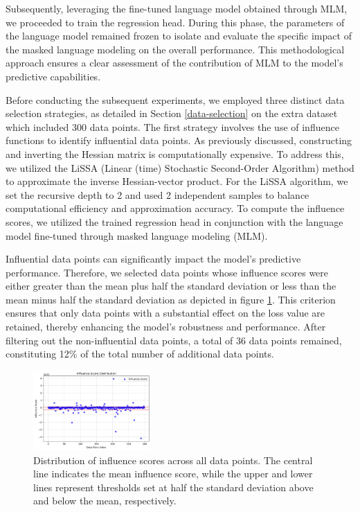 \documentclass[11pt]{article}
\begin{document}
Subsequently, leveraging the fine-tuned language model obtained through MLM, we proceeded to train the regression head. During this phase, the parameters of the language model remained frozen to isolate and evaluate the specific impact of the masked language modeling on the overall performance. This methodological approach ensures a clear assessment of the contribution of MLM to the model's predictive capabilities.

Before conducting the subsequent experiments, we employed three distinct data selection strategies, as detailed in Section \ref{data-selection} on the extra dataset which included 300 data points. The first strategy involves the use of influence functions to identify influential data points. As previously discussed, constructing and inverting the Hessian matrix is computationally expensive. To address this, we utilized the LiSSA (Linear (time) Stochastic Second-Order Algorithm) method to approximate the inverse Hessian-vector product. For the LiSSA algorithm, we set the recursive depth to 2 and used 2 independent samples to balance computational efficiency and approximation accuracy. To compute the influence scores, we utilized the trained regression head in conjunction with the language model fine-tuned through masked language modeling (MLM). 

Influential data points can significantly impact the model's predictive performance. Therefore, we selected data points whose influence scores were either greater than the mean plus half the standard deviation or less than the mean minus half the standard deviation as depicted in figure \ref{fig:influence-distrib}. This criterion ensures that only data points with a substantial effect on the loss value are retained, thereby enhancing the model's robustness and performance. After filtering out the non-influential data points, a total of 36 data points remained, constituting 12\% of the total number of additional data points.

\begin{figure}[htbp]
    \centering
    \includegraphics[width=0.4\textwidth]{influence_scatter_plot.png} 
    \caption{Distribution of influence scores across all data points. The central line indicates the mean influence score, while the upper and lower lines represent thresholds set at half the standard deviation above and below the mean, respectively.} %
    \label{fig:influence-distrib} 
\end{figure}
\end{document}
